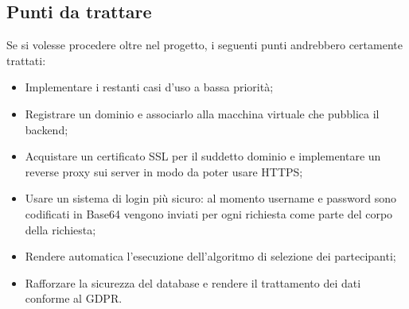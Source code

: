 \subsection{Punti da trattare}
Se si volesse procedere oltre nel progetto, i seguenti punti andrebbero certamente trattati:
\begin{itemize}
  \item Implementare i restanti casi d'uso a bassa priorità;
  \item Registrare un dominio e associarlo alla macchina virtuale che pubblica il backend;
  \item Acquistare un certificato SSL per il suddetto dominio e implementare un reverse proxy sui server in modo da poter usare HTTPS;
  \item Usare un sistema di login più sicuro: al momento username e password sono codificati in Base64 vengono inviati per ogni richiesta come parte del corpo della richiesta;
  \item Rendere automatica l'esecuzione dell'algoritmo di selezione dei partecipanti;
  \item Rafforzare la sicurezza del database e rendere il trattamento dei dati conforme al GDPR.
\end{itemize}